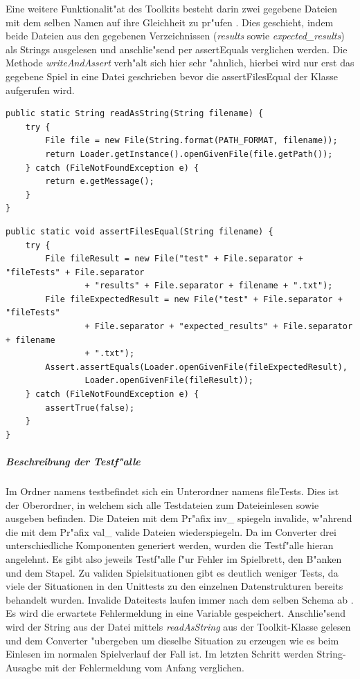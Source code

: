 Eine weitere Funktionalit"at des Toolkits besteht darin zwei gegebene Dateien mit dem selben Namen auf ihre Gleichheit zu pr"ufen . Dies geschieht, indem beide Dateien aus den gegebenen Verzeichnissen (\emph{results} sowie \emph{expected\_results}) als Strings ausgelesen und anschlie"send per assertEquals verglichen werden. Die Methode \emph{writeAndAssert} verh"alt sich hier sehr "ahnlich, hierbei wird nur erst das gegebene Spiel in eine Datei geschrieben bevor die assertFilesEqual der Klasse aufgerufen wird. 
\begin{lstlisting}[float,style=CodeHighlighting,caption=TestToolkit - readAsString,label=lst:testToolkit_readAsString]
public static String readAsString(String filename) {
    try {
        File file = new File(String.format(PATH_FORMAT, filename));
        return Loader.getInstance().openGivenFile(file.getPath());
    } catch (FileNotFoundException e) {
        return e.getMessage();
    }
}
\end{lstlisting}
\begin{lstlisting}[float,style=CodeHighlighting,caption=TestToolkit - assertFilesEqual,label=lst:testToolkit_assertFilesEqual]
public static void assertFilesEqual(String filename) {
    try {
        File fileResult = new File("test" + File.separator + "fileTests" + File.separator
                + "results" + File.separator + filename + ".txt");
        File fileExpectedResult = new File("test" + File.separator + "fileTests" 
        		+ File.separator + "expected_results" + File.separator + filename 
        		+ ".txt");
        Assert.assertEquals(Loader.openGivenFile(fileExpectedResult), 
        		Loader.openGivenFile(fileResult));
    } catch (FileNotFoundException e) {
        assertTrue(false);
    }
}
\end{lstlisting}

\subparagraph{Beschreibung der Testf"alle}
Im Ordner namens \glqq test\grqq befindet sich ein Unterordner namens \glqq fileTests\grqq {}. Dies ist der Oberordner, in welchem sich alle Testdateien zum Dateieinlesen sowie ausgeben befinden. Die Dateien mit dem Pr"afix \glqq inv\_\grqq {} spiegeln invalide, w"ahrend die mit dem Pr"afix \glqq val\_\grqq {} valide Dateien wiederspiegeln. Da im Converter drei unterschiedliche Komponenten generiert werden, wurden die Testf"alle hieran angelehnt. Es gibt also jeweils Testf"alle f"ur Fehler im Spielbrett, den B"anken und dem Stapel. Zu validen Spielsituationen gibt es deutlich weniger Tests, da viele der Situationen in den Unittests zu den einzelnen Datenstrukturen bereits behandelt wurden. Invalide Dateitests laufen immer nach dem selben Schema ab . Es wird die erwartete Fehlermeldung in eine Variable gespeichert. Anschlie"send wird der String aus der Datei mittels \emph{readAsString} aus der Toolkit-Klasse gelesen und dem Converter "ubergeben um dieselbe Situation zu erzeugen wie es beim Einlesen im normalen Spielverlauf der Fall ist. Im letzten Schritt werden String-Ausagbe mit der Fehlermeldung vom Anfang verglichen. 

